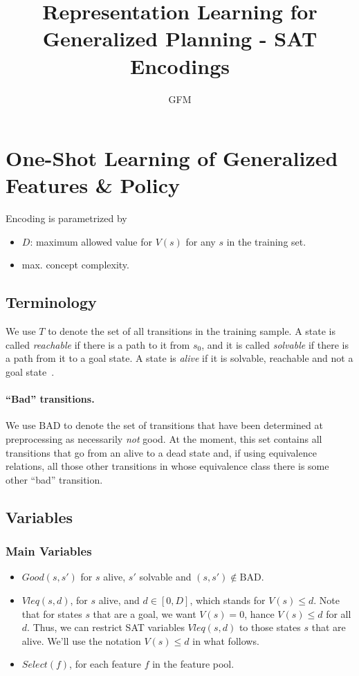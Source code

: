 \documentclass[a4paper]{article}
\title{Representation Learning for Generalized Planning - SAT Encodings}
\author{GFM}
\newcommand{\badtx}{\ensuremath{\mathrm{BAD}}}
\begin{document}
\maketitle

\section{One-Shot Learning of Generalized Features \& Policy}

Encoding is parametrized by
\begin{itemize}
 \item $D$: maximum allowed value for $V(s)$ for any $s$ in the training set.
 \item max. concept complexity.
\end{itemize}


\subsection{Terminology}
We use $T$ to denote the set of all transitions in the training sample.
A state is called \emph{reachable} if there is a path to it from $s_0$, and
it is called \emph{solvable} if there is a path from it to a goal
state.
A state is \emph{alive} if it is solvable, reachable and not a
goal state~\cite{frances-et-al-ijcai2019}.

\paragraph{``Bad'' transitions.}
We use \badtx{} to denote the set of transitions that have been determined at preprocessing as necessarily
\emph{not} good.
At the moment, this set contains all transitions that go from an alive to a dead state and, if using
equivalence relations, all those other transitions in whose equivalence class there is some other ``bad'' transition.


\subsection{Variables}

\subsubsection{Main Variables}
\begin{itemize}
 \item $Good(s, s')$ for $s$ alive, $s'$ solvable and $(s, s') \not\in \badtx$.

 \item $Vleq(s, d)$, for $s$ alive, and $d \in [0, D]$, which stands for $V(s) \leq d$.
 Note that for states $s$ that are a goal, we want $V(s)=0$, hance $V(s) \leq d$ for all $d$.
 Thus, we can restrict SAT variables $Vleq(s, d)$ to those states $s$ that are alive.
 We'll use the notation $V(s) \leq d$ in what follows.

 \item $Select(f)$, for each feature $f$ in the feature pool.
\end{itemize}
\end{document}

